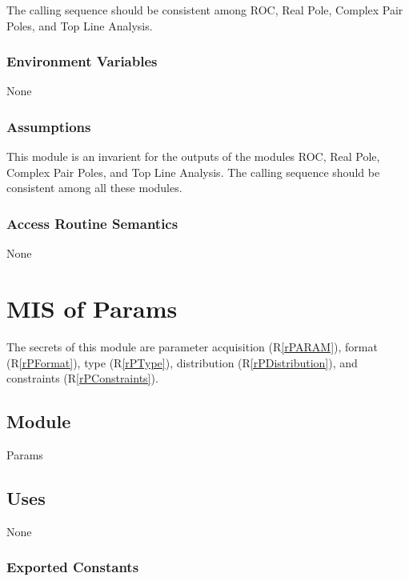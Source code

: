 \documentclass[12pt, titlepage]{article}
\newcommand{\rref}[1]{(R\ref{#1})}
\begin{document}
The calling sequence should be consistent among ROC, Real Pole, Complex Pair Poles, and Top Line Analysis.

\subsubsection{Environment Variables}

None

\subsubsection{Assumptions}

This module is an invarient for the outputs of the modules
ROC, Real Pole, Complex Pair Poles, and Top Line Analysis.
The calling sequence should be consistent among all these modules.

\subsubsection{Access Routine Semantics}

None


\newpage

\section{MIS of Params} \label{sc:MIS_PARAM}

The secrets of this module are parameter acquisition \rref{rPARAM},
format \rref{rPFormat}, type \rref{rPType}, distribution \rref{rPDistribution},
and constraints \rref{rPConstraints}.

\subsection{Module}

Params

\subsection{Uses}

None

\subsubsection{Exported Constants}
\end{document}
